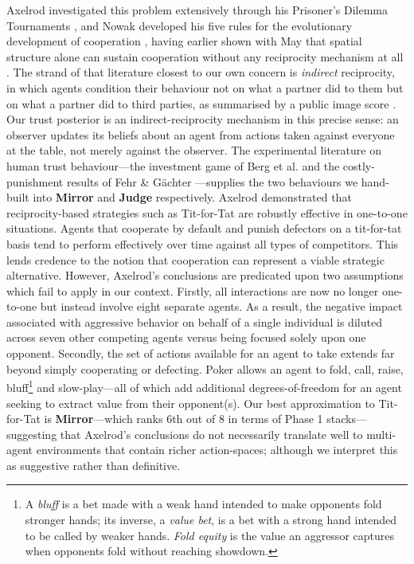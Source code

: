\documentclass[journal]{IEEEtran}
\newcommand{\arch}[1]{\textbf{#1}}
\begin{document}
Axelrod investigated this problem extensively through his Prisoner's
Dilemma Tournaments \citep{axelrod1984evolution}, and Nowak
developed his five rules for the evolutionary development of
cooperation \citep{nowak2006five}, having earlier shown with May
that spatial structure alone can sustain cooperation without any
reciprocity mechanism at all \citep{nowak1992spatial}. The strand of
that literature closest to our own concern is \emph{indirect}
reciprocity, in which agents condition their behaviour not on what a
partner did to them but on what a partner did to third parties, as
summarised by a public image score \citep{nowak1998evolution,
nowak2005evolution}. Our trust posterior is an indirect-reciprocity
mechanism in this precise sense: an observer updates its beliefs
about an agent from actions taken against everyone at the table, not
merely against the observer. The experimental literature on human
trust behaviour---the investment game of Berg et al.
\citep{berg1995trust} and the costly-punishment results of Fehr \&
G\"achter \citep{fehr2000cooperation}---supplies the two behaviours
we hand-built into \arch{Mirror} and \arch{Judge} respectively.
Axelrod demonstrated that
reciprocity-based strategies such as Tit-for-Tat are robustly
effective in one-to-one situations. Agents that cooperate by default
and punish defectors on a tit-for-tat basis tend to perform
effectively over time against all types of competitors. This lends
credence to the notion that cooperation can represent a viable
strategic alternative. However, Axelrod's conclusions are predicated
upon two assumptions which fail to apply in our context. Firstly,
all interactions are now no longer one-to-one but instead involve
eight separate agents. As a result, the negative impact associated
with aggressive behavior on behalf of a single individual is diluted
across seven other competing agents versus being focused solely upon
one opponent. Secondly, the set of actions available for an agent to
take extends far beyond simply cooperating or defecting. Poker
allows an agent to fold, call, raise,
bluff\footnote{A \textit{bluff} is a bet made with a weak hand
intended to make opponents fold stronger hands; its inverse, a
\textit{value bet}, is a bet with a strong hand intended to be
called by weaker hands. \textit{Fold equity} is the value an
aggressor captures when opponents fold without reaching showdown.}
and slow-play---all of which add additional degrees-of-freedom for
an agent seeking to extract value from their opponent(s). Our best
approximation to Tit-for-Tat is \arch{Mirror}---which ranks 6th out
of 8 in terms of Phase 1 stacks---suggesting that Axelrod's conclusions do
not necessarily translate well to multi-agent environments that
contain richer action-spaces; although we interpret this as
suggestive rather than definitive.
\end{document}
